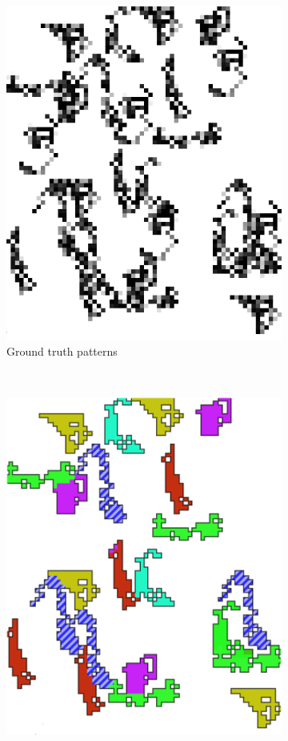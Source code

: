 \documentclass{llncs}
\begin{document}
\begin{figure}[p]
\begin{subfigure}[t]{0.25\textwidth}
\includegraphics[scale=.9]{img/exp_inputpatterns_2_cropped.png}
\caption{Ground truth patterns}
\label{fig:rilb}
\end{subfigure}%
~
\begin{subfigure}[t]{0.25\textwidth}
\centering
\includegraphics[scale=.9]{img/exp_result_2_cropped.png}

\end{subfigure}
\end{figure}
\end{document}
